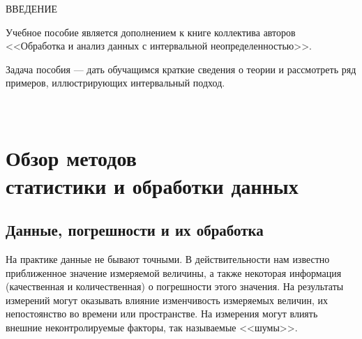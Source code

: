 \documentclass[a5paper,openany]{book}
\begin{document}
		
				\newpage
				\tableofcontents
				
				\newpage
				
				
				
				
				
	\begin{center}
		ВВЕДЕНИЕ
	\end{center}
					
				Учебное пособие является дополнением к книге коллектива авторов
				<<Обработка и анализ данных с интервальной неопределенностью>>.
				
				
				Задача пособия --- дать обучащимся краткие сведения о теории и рассмотреть ряд примеров, иллюстрирующих интервальный подход. 


\chapter[Обзор методов статистики и обработки данных]%
{\\Обзор методов \\ статистики и обработки данных} 

	\section{Данные, погрешности и их обработка} 


На практике данные не бывают точными. В действительности нам известно приближенное
значение измеряемой величины, а также некоторая информация (качественная 
и количественная) о погрешности этого значения.   
На результаты измерений могут оказывать влияние изменчивость измеряемых величин, 
их непостоянство во времени или пространстве. На измерения могут влиять внешние неконтролируемые факторы, так 
называемые <<шумы>>. 
\end{document}
